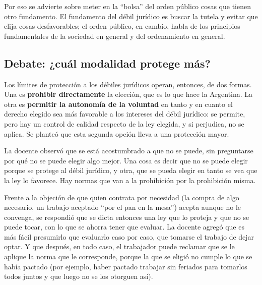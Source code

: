 \documentclass[12pt,oneside]{book}
\begin{document}

Por eso se advierte sobre meter en la ``bolsa'' del orden p\'ublico cosas que tienen otro fundamento. El fundamento del d\'ebil jur\'idico es buscar la tutela y evitar que elija cosas desfavorables; el orden p\'ublico, en cambio, habla de los principios fundamentales de la sociedad en general y del ordenamiento en general.

\subsection{Debate: ¿cu\'al modalidad protege m\'as?}

Los l\'imites de protecci\'on a los d\'ebiles jur\'idicos operan, entonces, de dos formas. Una es \textbf{prohibir directamente} la elecci\'on, que es lo que hace la Argentina. La otra es \textbf{permitir la autonom\'ia de la voluntad} en tanto y en cuanto el derecho elegido sea m\'as favorable a los intereses del d\'ebil jur\'idico: se permite, pero hay un control de calidad respecto de la ley elegida, y si perjudica, no se aplica. Se plante\'o que esta segunda opci\'on lleva a una protecci\'on mayor.

La docente observ\'o que se est\'a acostumbrado a que no se puede, sin preguntarse por qu\'e no se puede elegir algo mejor. Una cosa es decir que no se puede elegir porque se protege al d\'ebil jur\'idico, y otra, que se pueda elegir en tanto se vea que la ley lo favorece. Hay normas que van a la prohibici\'on por la prohibici\'on misma.

Frente a la objeci\'on de que quien contrata por necesidad (la compra de algo necesario, un trabajo aceptado ``por el pan en la mesa'') acepta aunque no le convenga, se respondi\'o que se dicta entonces una ley que lo proteja y que no se puede tocar, con lo que se ahorra tener que evaluar. La docente agreg\'o que es m\'as f\'acil presumirlo que evaluarlo caso por caso, que tomarse el trabajo de dejar optar. Y que despu\'es, en todo caso, el trabajador puede reclamar que se le aplique la norma que le corresponde, porque la que se eligi\'o no cumple lo que se hab\'ia pactado (por ejemplo, haber pactado trabajar sin feriados para tomarlos todos juntos y que luego no se los otorguen as\'i).

\end{document}

